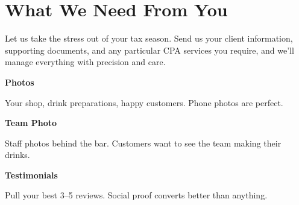 \documentclass[11pt,letterpaper]{article}
\begin{document}
\vspace{0.2em}

\section*{What We Need From You}

Let us take the stress out of your tax season. Send us your client information, supporting documents, and any particular CPA services you require, and we’ll manage everything with precision and care.

\vspace{0.12em}

\noindent\begin{minipage}[t]{0.48\textwidth}
\begin{tcolorbox}[colframe=accent-teal, boxrule=1pt, left=0.7em, right=0.7em, top=0.5em, bottom=0.5em, arc=4pt, boxsep=0pt]
{\bfseries\small\color{accent-teal}Photos}

\vspace{0.15em}

{\small Your shop, drink preparations, happy customers. Phone photos are perfect.}
\end{tcolorbox}

\vspace{0.1em}

\begin{tcolorbox}[colframe=accent-teal, boxrule=1pt, left=0.7em, right=0.7em, top=0.5em, bottom=0.5em, arc=4pt, boxsep=0pt]
{\bfseries\small\color{accent-teal}Team Photo}

\vspace{0.15em}

{\small Staff photos behind the bar. Customers want to see the team making their drinks.}
\end{tcolorbox}

\vspace{0.1em}

\begin{tcolorbox}[colframe=accent-teal, boxrule=1pt, left=0.7em, right=0.7em, top=0.5em, bottom=0.5em, arc=4pt, boxsep=0pt]
{\bfseries\small\color{accent-teal}Testimonials}

\vspace{0.15em}

{\small Pull your best 3--5 reviews. Social proof converts better than anything.}
\end{tcolorbox}
\end{minipage}
\hfill
\end{document}
